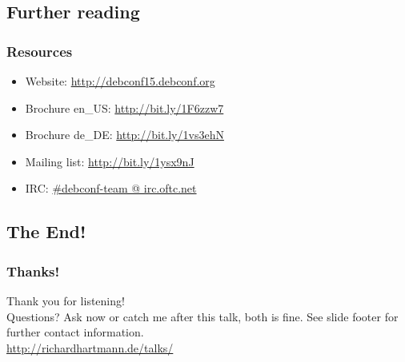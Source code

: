 \documentclass[t]{beamer}
\begin{document}
\subsection{Further reading}

\begin{frame}
	\frametitle{Resources}
	\vfill
	\begin{itemize}
		\item Website: \url{http://debconf15.debconf.org}
		\item Brochure en\_US: \url{http://bit.ly/1F6zzw7}
		\item Brochure de\_DE: \url{http://bit.ly/1vs3ehN}
		\item Mailing list: \url{http://bit.ly/1ysx9nJ}
		\item IRC: \url{\#debconf-team @ irc.oftc.net}
	\end{itemize}
	\vfill
\end{frame}


\subsection{The End!}

\begin{frame}
	\frametitle{Thanks!}
		\begin{center}
			\vfill
			Thank you for listening!\\
			\vfill
			Questions? Ask now or catch me after this talk, both is fine.
			\vfill
			See slide footer for further contact information.\\
			\vfill
			\url{http://richardhartmann.de/talks/}
			\vfill
		\end{center}
\end{frame}
\end{document}

